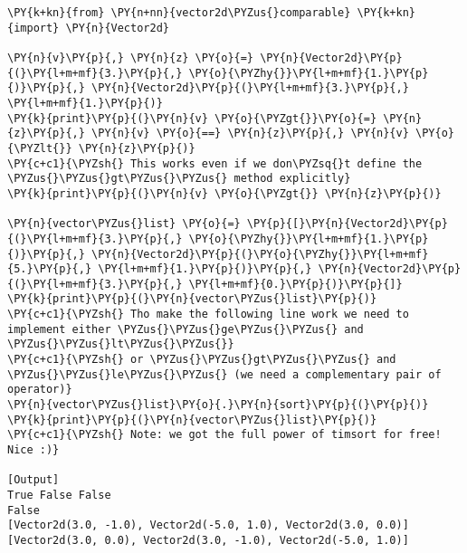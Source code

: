 \begin{Verbatim}[label=\makebox{\url{https://bitbucket.org/lbaldini/programming/src/tip/snippets/test\_vector2d\_comparable.py}},commandchars=\\\{\}]
\PY{k+kn}{from} \PY{n+nn}{vector2d\PYZus{}comparable} \PY{k+kn}{import} \PY{n}{Vector2d}

\PY{n}{v}\PY{p}{,} \PY{n}{z} \PY{o}{=} \PY{n}{Vector2d}\PY{p}{(}\PY{l+m+mf}{3.}\PY{p}{,} \PY{o}{\PYZhy{}}\PY{l+m+mf}{1.}\PY{p}{)}\PY{p}{,} \PY{n}{Vector2d}\PY{p}{(}\PY{l+m+mf}{3.}\PY{p}{,} \PY{l+m+mf}{1.}\PY{p}{)}
\PY{k}{print}\PY{p}{(}\PY{n}{v} \PY{o}{\PYZgt{}}\PY{o}{=} \PY{n}{z}\PY{p}{,} \PY{n}{v} \PY{o}{==} \PY{n}{z}\PY{p}{,} \PY{n}{v} \PY{o}{\PYZlt{}} \PY{n}{z}\PY{p}{)}
\PY{c+c1}{\PYZsh{} This works even if we don\PYZsq{}t define the \PYZus{}\PYZus{}gt\PYZus{}\PYZus{} method explicitly}
\PY{k}{print}\PY{p}{(}\PY{n}{v} \PY{o}{\PYZgt{}} \PY{n}{z}\PY{p}{)}

\PY{n}{vector\PYZus{}list} \PY{o}{=} \PY{p}{[}\PY{n}{Vector2d}\PY{p}{(}\PY{l+m+mf}{3.}\PY{p}{,} \PY{o}{\PYZhy{}}\PY{l+m+mf}{1.}\PY{p}{)}\PY{p}{,} \PY{n}{Vector2d}\PY{p}{(}\PY{o}{\PYZhy{}}\PY{l+m+mf}{5.}\PY{p}{,} \PY{l+m+mf}{1.}\PY{p}{)}\PY{p}{,} \PY{n}{Vector2d}\PY{p}{(}\PY{l+m+mf}{3.}\PY{p}{,} \PY{l+m+mf}{0.}\PY{p}{)}\PY{p}{]}
\PY{k}{print}\PY{p}{(}\PY{n}{vector\PYZus{}list}\PY{p}{)}
\PY{c+c1}{\PYZsh{} Tho make the following line work we need to implement either \PYZus{}\PYZus{}ge\PYZus{}\PYZus{} and \PYZus{}\PYZus{}lt\PYZus{}\PYZus{}}
\PY{c+c1}{\PYZsh{} or \PYZus{}\PYZus{}gt\PYZus{}\PYZus{} and \PYZus{}\PYZus{}le\PYZus{}\PYZus{} (we need a complementary pair of operator)}
\PY{n}{vector\PYZus{}list}\PY{o}{.}\PY{n}{sort}\PY{p}{(}\PY{p}{)}
\PY{k}{print}\PY{p}{(}\PY{n}{vector\PYZus{}list}\PY{p}{)}
\PY{c+c1}{\PYZsh{} Note: we got the full power of timsort for free! Nice :)}

[Output]
True False False
False
[Vector2d(3.0, -1.0), Vector2d(-5.0, 1.0), Vector2d(3.0, 0.0)]
[Vector2d(3.0, 0.0), Vector2d(3.0, -1.0), Vector2d(-5.0, 1.0)]
\end{Verbatim}